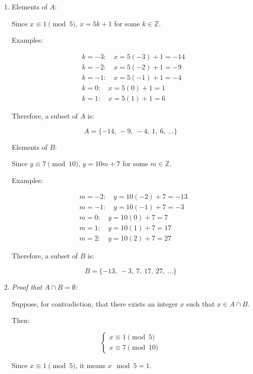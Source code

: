 \documentclass[12pt]{article}
\theoremstyle{definition}
\begin{document}
\begin{enumerate}[label=(\alph*)]
    \item Elements of $A$:

    Since $x \equiv 1 \pmod{5}$, $x = 5k + 1$ for some $k \in \mathbb{Z}$.

    Examples:

    \[
    \begin{aligned}
    &k = -3: \quad x = 5(-3) + 1 = -14 \\
    &k = -2: \quad x = 5(-2) + 1 = -9 \\
    &k = -1: \quad x = 5(-1) + 1 = -4 \\
    &k = 0: \quad x = 5(0) + 1 = 1 \\
    &k = 1: \quad x = 5(1) + 1 = 6
    \end{aligned}
    \]

    Therefore, a subset of $A$ is:

    \[
    A = \{ -14,\ -9,\ -4,\ 1,\ 6,\ \ldots \}
    \]

    Elements of $B$:

    Since $y \equiv 7 \pmod{10}$, $y = 10m + 7$ for some $m \in \mathbb{Z}$.

    Examples:

    \[
    \begin{aligned}
    &m = -2: \quad y = 10(-2) + 7 = -13 \\
    &m = -1: \quad y = 10(-1) + 7 = -3 \\
    &m = 0: \quad y = 10(0) + 7 = 7 \\
    &m = 1: \quad y = 10(1) + 7 = 17 \\
    &m = 2: \quad y = 10(2) + 7 = 27
    \end{aligned}
    \]

    Therefore, a subset of $B$ is:

    \[
    B = \{ -13,\ -3,\ 7,\ 17,\ 27,\ \ldots \}
    \]

    \item \textit{Proof that $A \cap B = \emptyset$:}

    Suppose, for contradiction, that there exists an integer $x$ such that $x \in A \cap B$.

    Then:

    \[
    \begin{cases}
    x \equiv 1 \pmod{5} \\
    x \equiv 7 \pmod{10}
    \end{cases}
    \]

    Since $x \equiv 1 \pmod{5}$, it means $x \mod 5 = 1$.


\end{enumerate}
\end{document}
